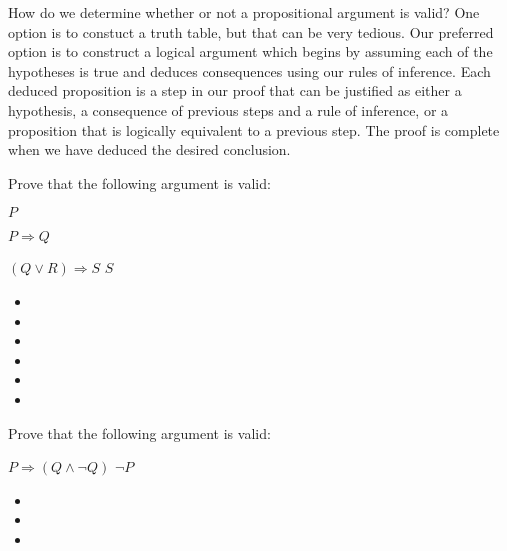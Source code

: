 How do we determine whether or not a propositional argument is valid? One option is to constuct a truth table, but that can be very tedious. Our preferred option is to construct a logical argument which begins by assuming each of the hypotheses is true and deduces consequences using our rules of inference. Each deduced proposition is a step in our proof that can be justified as either a hypothesis, a consequence of previous steps and a rule of inference, or a proposition that is logically equivalent to a previous step. The proof is complete when we have deduced the desired conclusion. 

\begin{example}\label{ex:arg1}
Prove that the following argument is valid:
{\setlength\linwid{1in}
\begin{centeredarg}
\item $P$
\item $P\Rightarrow Q$
\item $(Q\lor R)\Rightarrow S$
\hence $S$
\end{centeredarg}}
\begin{itemize}\itemsep0pt\itemindent-2em
\item[]
\item[]
\item[]
\item[]
\item[]
\item[]
\end{itemize}
\end{example}

\begin{example}\label{ex:contradiction}
Prove that the following argument is valid:
{\setlength\linwid{1.2in}
\begin{centeredarg}
\item $P\Rightarrow(Q\land\neg Q)$
\hence $\neg P$
\end{centeredarg}}
\begin{itemize}\itemsep0pt\itemindent-2em
\item[]
\item[]
\item[]
\end{itemize}
\end{example}

